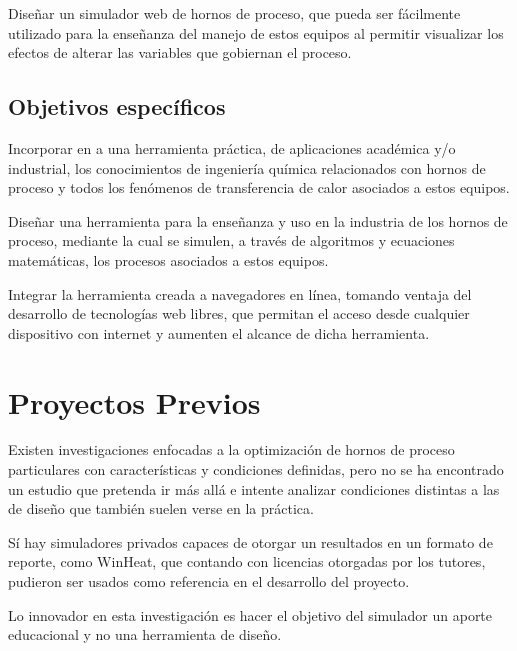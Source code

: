 \par Diseñar un simulador web de hornos de proceso, que pueda ser fácilmente utilizado para la enseñanza del manejo de estos equipos al permitir visualizar los efectos de alterar las variables que gobiernan el proceso.

\subsection{Objetivos específicos}

\par Incorporar en a una herramienta práctica, de aplicaciones académica y/o industrial, los conocimientos de ingeniería química relacionados con hornos de proceso y todos los fenómenos de transferencia de calor asociados a estos equipos.

\par Diseñar una herramienta para la enseñanza y uso en la industria de los hornos de proceso, mediante la cual se simulen, a través de algoritmos y ecuaciones matemáticas, los procesos asociados a estos equipos.

\par Integrar la herramienta creada a navegadores en línea, tomando ventaja del desarrollo de tecnologías web libres, que permitan el acceso desde cualquier dispositivo con internet y aumenten el alcance de dicha herramienta.

\section{Proyectos Previos}

\par Existen investigaciones enfocadas a la optimización de hornos de proceso particulares\cite{bib:leti} con características y condiciones definidas, pero no se ha encontrado un estudio que pretenda ir más allá e intente analizar condiciones distintas a las de diseño que también suelen verse en la práctica.

\par Sí hay simuladores privados capaces de otorgar un resultados en un formato de reporte, como WinHeat\textsuperscript{\textcopyright}, que contando con licencias otorgadas por los tutores, pudieron ser usados como referencia en el desarrollo del proyecto.

\par Lo innovador en esta investigación es hacer el objetivo del simulador un aporte educacional y no una herramienta de diseño.